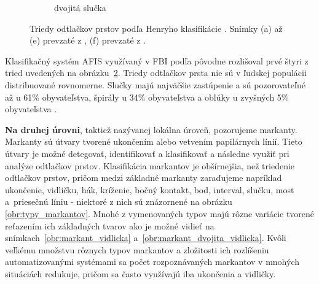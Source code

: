 \begin{figure}[h]
\begin{subfigure}[b]{0.19\linewidth}
      \caption{dvojitá slučka}
      \label{obr:triedy_odtlackov/dvojita_slucka}
    \end{subfigure}
    \caption{Triedy odtlačkov prstov podľa Henryho klasifikácie \cite{Henry}. Snímky (a) až (e) prevzaté z \cite{Handbook}, (f) prevzaté z \cite{Drahansky}.}
    \label{obr:triedy_odtlackov}
  \end{figure}
  Klasifikačný systém AFIS využívaný v FBI podľa \cite{FingerprintSrcBook} pôvodne rozlišoval prvé štyri z tried uvedených na obrázku~{\ref{obr:triedy_odtlackov}}.
  Triedy odtlačkov prsta nie sú v ľudskej populácii distribuované rovnomerne.
  Slučky majú najväčšie zastúpenie a sú pozorovateľné až u 61\% obyvateľstva, špirály u 34\% obyvateľstva a oblúky u zvyšných
  5\% obyvateľstva \cite{sciencing}.

  \textbf{Na druhej úrovni}, taktiež nazývanej lokálna úroveň, pozorujeme markanty. Markanty sú útvary tvorené ukončením alebo
  vetvením papilárnych línií. Tieto útvary je možné detegovať, identifikovať a klasifikovať a následne využiť pri analýze odtlačkov prstov.
  Klasifikácia markantov je obšírnejšia, než triedenie odtlačkov prstov, pričom medzi základné markanty zaraďujeme napríklad
  ukončenie, vidličku, hák, kríženie, bočný kontakt, bod, interval, slučku, most a~priesečnú líniu \cite{Drahansky} - niektoré z nich sú znázornené na obrázku
  \ref{obr:typy_markantov}. Mnohé z vymenovaných typov majú rôzne
  variácie tvorené reťazením ich základných tvarov ako je možné vidieť na snímkach~{\ref{obr:markant_vidlicka}} a~{\ref{obr:markant_dvojita_vidlicka}}.
  Kvôli veľkému množstvu rôznych typov markantov a zložitosti ich rozlíšeniu automatizovanými systémami sa počet rozpoznávaných markantov v mnohých
  situáciách redukuje, pričom sa často využívajú iba ukončenia a vidličky.

